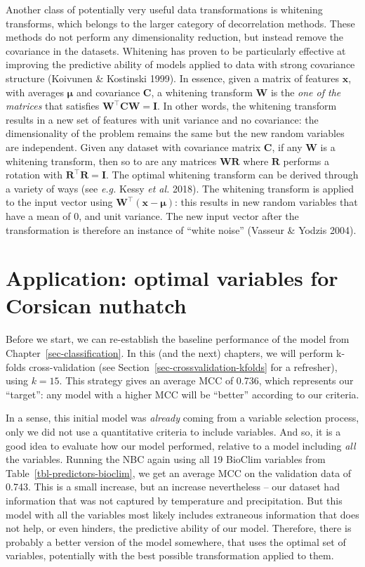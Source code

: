 \documentclass[
  letterpaper,
]{scrbook}
\begin{document}
Another class of potentially very useful data transformations is
whitening transforms, which belongs to the larger category of
decorrelation methods. These methods do not perform any dimensionality
reduction, but instead remove the covariance in the datasets. Whitening
has proven to be particularly effective at improving the predictive
ability of models applied to data with strong covariance structure
(Koivunen \& Kostinski 1999). In essence, given a matrix of features
\(\mathbf{x}\), with averages \(\mathbf{\mu}\) and covariance
\(\mathbf{C}\), a whitening transform \(\mathbf{W}\) is the \emph{one of
the matrices} that satisfies
\(\mathbf{W}^\top\mathbf{C}\mathbf{W} = \mathbf{I}\). In other words,
the whitening transform results in a new set of features with unit
variance and no covariance: the dimensionality of the problem remains
the same but the new random variables are independent. Given any dataset
with covariance matrix \(\mathbf{C}\), if any \(\mathbf{W}\) is a
whitening transform, then so to are any matrices
\(\mathbf{W}\mathbf{R}\) where \(\mathbf{R}\) performs a rotation with
\(\mathbf{R}^\top\mathbf{R} = \mathbf{I}\). The optimal whitening
transform can be derived through a variety of ways (see \emph{e.g.}
Kessy \emph{et al.} 2018). The whitening transform is applied to the
input vector using \(\mathbf{W}^\top (\mathbf{x}-\mathbf{\mu})\): this
results in new random variables that have a mean of 0, and unit
variance. The new input vector after the transformation is therefore an
instance of ``white noise'' (Vasseur \& Yodzis 2004).

\section{Application: optimal variables for Corsican
nuthatch}\label{application-optimal-variables-for-corsican-nuthatch}

Before we start, we can re-establish the baseline performance of the
model from Chapter~\ref{sec-classification}. In this (and the next)
chapters, we will perform k-folds cross-validation (see
Section~\ref{sec-crossvalidation-kfolds} for a refresher), using
\(k=15\). This strategy gives an average MCC of 0.736, which represents
our ``target'': any model with a higher MCC will be ``better'' according
to our criteria.

In a sense, this initial model was \emph{already} coming from a variable
selection process, only we did not use a quantitative criteria to
include variables. And so, it is a good idea to evaluate how our model
performed, relative to a model including \emph{all} the variables.
Running the NBC again using all 19 BioClim variables from
Table~\ref{tbl-predictors-bioclim}, we get an average MCC on the
validation data of 0.743. This is a small increase, but an increase
nevertheless -- our dataset had information that was not captured by
temperature and precipitation. But this model with all the variables
most likely includes extraneous information that does not help, or even
hinders, the predictive ability of our model. Therefore, there is
probably a better version of the model somewhere, that uses the optimal
set of variables, potentially with the best possible transformation
applied to them.
\end{document}
